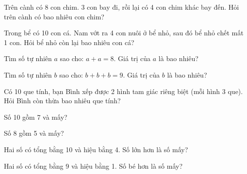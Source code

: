 \begin{ex}
Trên cành có 8 con chim. 3 con bay đi, rồi lại có 4 con chim khác bay đến. Hỏi trên cành có bao nhiêu con chim?
\end{ex}

\begin{ex}
Trong bể có 10 con cá. Nam vớt ra 4 con nuôi ở bể nhỏ, sau đó bể nhỏ chết mất 1 con. Hỏi bể nhỏ còn lại bao nhiêu con cá?
\end{ex}

\begin{ex}
Tìm số tự nhiên $a$ sao cho: $a + a = 8$. Giá trị của $a$ là bao nhiêu?
\end{ex}

\begin{ex}
Tìm số tự nhiên $b$ sao cho: $b + b + b = 9$. Giá trị của $b$ là bao nhiêu?
\end{ex}

\begin{ex}
Có 10 que tính, bạn Bình xếp được 2 hình tam giác riêng biệt (mỗi hình 3 que). Hỏi Bình còn thừa bao nhiêu que tính?
\end{ex}

\begin{ex}
Số 10 gồm 7 và mấy?
\end{ex}

\begin{ex}
Số 8 gồm 5 và mấy?
\end{ex}

\begin{ex}
Hai số có tổng bằng 10 và hiệu bằng 4. Số lớn hơn là số mấy?
\end{ex}

\begin{ex}
Hai số có tổng bằng 9 và hiệu bằng 1. Số bé hơn là số mấy?
\end{ex}

